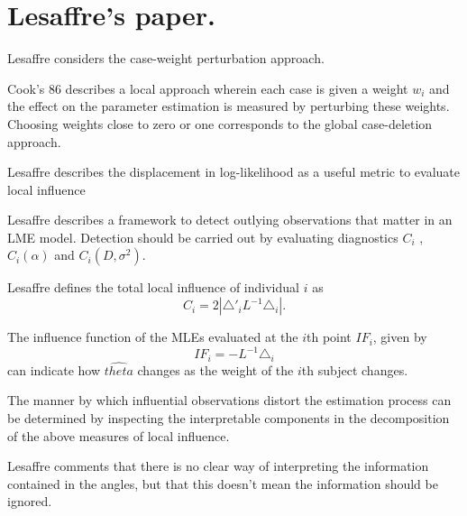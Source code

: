 \documentclass[Main.tex]{subfiles}
\begin{document}
	\newpage
	\section{Lesaffre's paper.}
	Lesaffre considers the case-weight perturbation approach.
	
	
	\citep{cook86}
	Cook's 86 describes a local approach wherein each case is given a
	weight $w_{i}$ and the effect on the parameter estimation is
	measured by perturbing these weights. Choosing weights close to
	zero or one corresponds to the global case-deletion approach.
	
	Lesaffre  describes the displacement in log-likelihood as a useful
	metric to evaluate local influence %
	
	Lesaffre describes a framework to detect outlying observations
	that matter in an LME model. Detection should be carried out by
	evaluating diagnostics $C_{i}$ , $C_{i}(\alpha)$ and $C_{i}(D,
	\sigma^2)$.
	
	Lesaffre defines the total local influence of individual $i$ as
	\begin{equation}
	C_{i} = 2 | \triangle \prime _{i} L^{-1} \triangle_{i}|.
	\end{equation}
	
	The influence function of the MLEs evaluated at the $i$th point
	$IF_{i}$, given by
	\begin{equation}
	IF_{i} = -L^{-1}\triangle _{i}
	\end{equation}
	can indicate how $\hat{theta}$ changes as the weight of the $i$th
	subject changes.
	
	The manner by which influential observations
	distort the estimation process can be determined by inspecting the
	interpretable components in the decomposition of the above
	measures of local influence.
	
	
	Lesaffre comments that there is no clear way of interpreting the
	information contained in the angles, but that this doesn't mean
	the information should be ignored.
	\newpage
\end{document}
